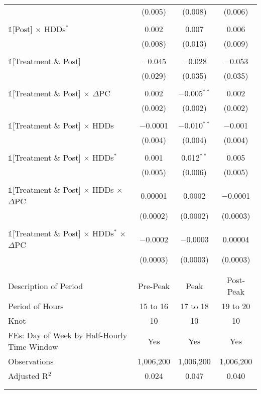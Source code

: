 {\begin{table}[t!]
\begin{ThreePartTable}
\begin{longtable}{@{\extracolsep{40pt}}lccc}
                & (0.005) & (0.008) & (0.006) \\
                & & & \\
                $\mathbb{1}$[Post] $\times$ HDDs$^{*}$ & 0.002 & 0.007 & 0.006 \\
                & (0.008) & (0.013) & (0.009) \\
                & & & \\
                $\mathbb{1}$[Treatment \& Post] & $-$0.045 & $-$0.028 & $-$0.053 \\
                & (0.029) & (0.035) & (0.035) \\
                & & & \\
                $\mathbb{1}$[Treatment \& Post] $\times$ $\Delta$PC & 0.002 & $-$0.005$^{**}$ & 0.002 \\
                & (0.002) & (0.002) & (0.002) \\
                & & & \\
                $\mathbb{1}$[Treatment \& Post] $\times$ HDDs & $-$0.0001 & $-$0.010$^{**}$ & $-$0.001 \\
                & (0.004) & (0.004) & (0.004) \\
                & & & \\
                $\mathbb{1}$[Treatment \& Post] $\times$ HDDs$^{*}$ & 0.001 & 0.012$^{**}$ & 0.005 \\
                & (0.005) & (0.006) & (0.005) \\
                & & & \\
                $\mathbb{1}$[Treatment \& Post] $\times$ HDDs $\times$ $\Delta$PC & 0.00001 & 0.0002 & $-$0.0001 \\
                & (0.0002) & (0.0002) & (0.0003) \\
                & & & \\
                $\mathbb{1}$[Treatment \& Post] $\times$ HDDs$^{*}$ $\times$ $\Delta$PC & $-$0.0002 & $-$0.0003 & 0.00004 \\
                & (0.0003) & (0.0003) & (0.0003) \\
                & & & \\
                \hline
                \\[-2.0ex]
                Description of Period & Pre-Peak & Peak & Post-Peak \\
                Period of Hours & 15 to 16 & 17 to 18 & 19 to 20 \\
                Knot & 10 & 10 & 10 \\
                FEs: Day of Week by Half-Hourly Time Window & Yes & Yes & Yes \\
                Observations & 1,006,200 & 1,006,200 & 1,006,200 \\
                Adjusted R$^{2}$ & 0.024 & 0.047 & 0.040 \\
                \\[-2.0ex]
                \hline \hline
                \\[-4.5ex]


\end{longtable}
\end{ThreePartTable}
\end{table}}
